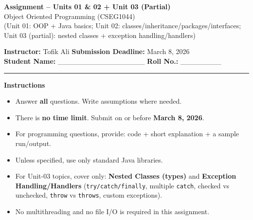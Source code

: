\documentclass[11pt,a4paper]{article}
\newcommand{\SubmissionDeadline}{March 8, 2026}
\begin{document}
\begin{center}
  {\LARGE \textbf{Assignment -- Units 01 \& 02 + Unit 03 (Partial)}}\\[0.25em]
  {\large Object Oriented Programming (CSEG1044)}\\[0.25em]
  \normalsize (Unit 01: OOP + Java basics; Unit 02: classes/inheritance/packages/interfaces; Unit 03 (partial): nested classes + exception handling/handlers)
\end{center}

\noindent
\textbf{Instructor:} Tofik Ali \hfill \textbf{Submission Deadline:} \SubmissionDeadline\\
\textbf{Student Name:} \_\_\_\_\_\_\_\_\_\_\_\_\_\_\_\_\_ \hfill \textbf{Roll No.:} \_\_\_\_\_\_\_\_\\

\vspace{0.6em}
\hrule
\vspace{0.8em}

\textbf{Instructions}
\begin{itemize}[leftmargin=*]
  \item Answer \textbf{all} questions. Write assumptions where needed.
  \item There is \textbf{no time limit}. Submit on or before \textbf{\SubmissionDeadline}.
  \item For programming questions, provide: code + short explanation + a sample run/output.
  \item Unless specified, use only standard Java libraries.
  \item For Unit-03 topics, cover only: \textbf{Nested Classes (types)} and \textbf{Exception Handling/Handlers}
    (\texttt{try/catch/finally}, multiple \texttt{catch}, checked vs unchecked, \texttt{throw} vs \texttt{throws}, custom exceptions).
  \item No multithreading and no file I/O is required in this assignment.
\end{itemize}

\vspace{0.6em}
\end{document}
